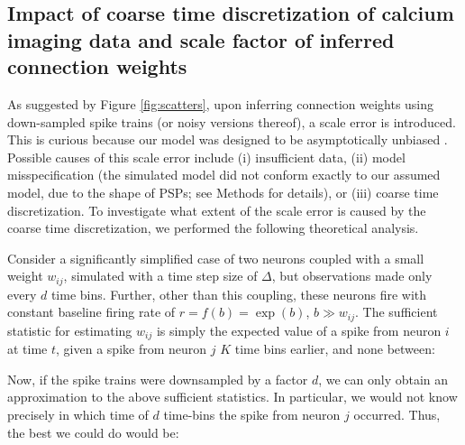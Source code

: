 \subsection{Impact of coarse time discretization of calcium imaging data and scale factor of inferred connection weights} \label{sec:scale}

As suggested by Figure \ref{fig:scatters}, upon inferring connection weights using down-sampled spike trains (or noisy versions thereof), a scale error is introduced. This is curious because our model was designed to be asymptotically unbiased \cite{PAN03d}. Possible causes of this scale error include (i) insufficient data,  (ii) model misspecification (the simulated model did not conform exactly to our assumed model, due to the shape of PSPs; see Methods for details), or (iii) coarse time discretization.  To investigate what extent of the scale error is caused by the coarse time discretization, we performed the following theoretical analysis.   

Consider a significantly simplified case of two neurons coupled with a small weight $w_{ij}$, simulated with a time step size of $\Delta$, but observations made only every $d$ time bins. Further, other than this coupling, these neurons fire with constant baseline firing rate of $r=f(b)=\exp(b)$, $b \gg w_{ij}$. The sufficient statistic for estimating $w_{ij}$ is simply the expected value of a spike from neuron $i$ at time $t$, given a spike from neuron $j$ $K$ time bins earlier, and none between:

Now, if the spike trains were downsampled by a factor $d$, we can only obtain an approximation to the above sufficient statistics. In particular, we would not know precisely in which time of $d$ time-bins the spike from neuron $j$ occurred.  Thus, the best we could do would be:

